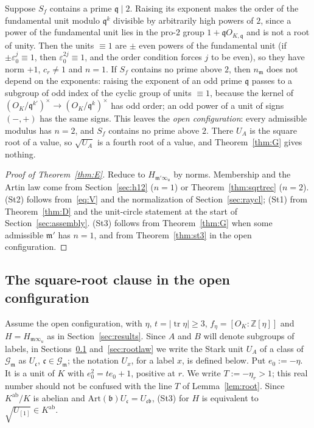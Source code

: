 \documentclass[11pt]{amsart}
\numberwithin{equation}{section}
\theoremstyle{plain}
\theoremstyle{definition}
\theoremstyle{remark}
\newcommand{\tr}{\operatorname{tr}}
\begin{document}
Suppose \(S_f\) contains a prime \(\mathfrak q\mid2\). Raising its exponent makes the order of the fundamental unit modulo \(\mathfrak q^k\) divisible by arbitrarily high powers of \(2\), since a power of the fundamental unit lies in the pro-\(2\) group \(1+\mathfrak qO_{K,\mathfrak q}\) and is not a root of unity. Then the units \(\equiv1\) are \(\pm\) even powers of the fundamental unit (if \(\pm\varepsilon_0^j\equiv1\), then \(\varepsilon_0^{2j}\equiv1\), and the order condition forces \(j\) to be even), so they have norm \(+1\), \(c_r\ne1\) and \(n=1\). If \(S_f\) contains no prime above \(2\), then \(n_{\mathfrak m}\) does not depend on the exponents: raising the exponent of an odd prime \(\mathfrak q\) passes to a subgroup of odd index of the cyclic group of units \(\equiv1\), because the kernel of \((O_K/\mathfrak q^{k'})^\times\to(O_K/\mathfrak q^k)^\times\) has odd order; an odd power of a unit of signs \((-,+)\) has the same signs. This leaves the \emph{open configuration}: every admissible modulus has \(n=2\), and \(S_f\) contains no prime above \(2\). There \(U_A\) is the square root of a value, so \(\sqrt{U_A}\) is a fourth root of a value, and Theorem~\ref{thm:G} gives nothing.

\begin{proof}[Proof of Theorem~\ref{thm:E}]
Reduce to \(H_{\mathfrak m'\infty_u}\) by norms. Membership and the Artin law come from Section~\ref{sec:h12} (\(n=1\)) or Theorem~\ref{thm:sqrtrec} (\(n=2\)). (St2) follows from~\eqref{eq:V} and the normalization of Section~\ref{sec:raycl}; (St1) from Theorem~\ref{thm:D} and the unit-circle statement at the start of Section~\ref{sec:assembly}. (St3) follows from Theorem~\ref{thm:G} when some admissible \(\mathfrak m'\) has \(n=1\), and from Theorem~\ref{thm:st3} in the open configuration.
\end{proof}

\subsection{The square-root clause in the open configuration}\label{sec:open}

Assume the open configuration, with \(\eta\), \(t=|\tr\eta|\ge3\), \(f_\eta=[O_K:\mathbb Z[\eta]]\) and \(H=H_{\mathfrak m\infty_u}\) as in Section~\ref{sec:results}. Since \(A\) and \(B\) will denote subgroups of labels, in Sections~\ref{sec:open} and~\ref{sec:rootlaw} we write the Stark unit \(U_A\) of a class of \(\mathcal G_{\mathfrak m}\) as \(U_{\mathfrak c}\), \(\mathfrak c\in\mathcal G_{\mathfrak m}\); the notation \(U_x\), for a label \(x\), is defined below. Put \(e_0:=-\eta\). It is a unit of \(K\) with \(e_0^2=te_0+1\), positive at \(r\). We write \(T:=-\eta_r>1\); this real number should not be confused with the line \(T\) of Lemma~\ref{lem:root}. Since \(K^{\mathrm{ab}}/K\) is abelian and \(\mathrm{Art}(\mathfrak b)U_{\mathfrak c}=U_{\mathfrak c\mathfrak b}\), (St3) for \(H\) is equivalent to \(\sqrt{U_{[1]}}\in K^{\mathrm{ab}}\).
\end{document}
